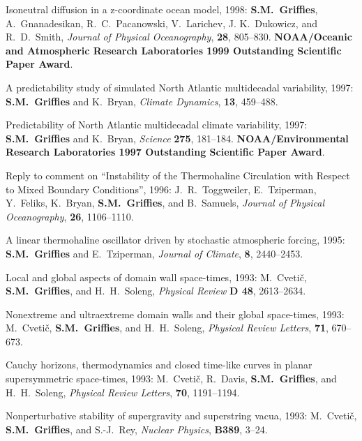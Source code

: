 \begin{etaremune}
\item Isoneutral diffusion in a z-coordinate ocean model, 1998: {\bf
    S.M.\ Grif\/f\/ies}, A.\ Gnanadesikan, R.\ C.\ Pacanowski, V.\
  Larichev, J. K.\ Dukowicz, and R.\ D.\ Smith, {\em Journal of
    Physical Oceanography}, {\bf 28}, 805--830.  {\bf
    NOAA/Oceanic and Atmospheric Research Laboratories 1999
    Outstanding Scientific Paper Award}.
  
\item A predictability study of simulated North Atlantic multidecadal
variability, 1997: {\bf S.M.\ Grif\/f\/ies} and K.\ Bryan, {\em
Climate Dynamics}, {\bf 13}, 459--488.
  
\item Predictability of North Atlantic multidecadal climate
  variability, 1997: {\bf S.M.\ Grif\/f\/ies} and K.\ Bryan, {\em
    Science} {\bf 275}, 181--184. {\bf NOAA/Environmental
    Research Laboratories 1997 Outstanding Scientific Paper Award}.
 
\item Reply to comment on ``Instability of the Thermohaline
Circulation with Respect to Mixed Boundary Conditions'', 1996: J.\ R.\
Toggweiler, E.\ Tziperman, Y.\ Feliks, K.\ Bryan, {\bf S.M.\
Grif\/f\/ies}, and B.\ Samuels, {\em Journal of Physical
Oceanography}, {\bf 26}, 1106--1110.
  
\item A linear thermohaline oscillator driven by stochastic
atmospheric forcing, 1995: {\bf S.M.\ Grif\/f\/ies} and E.\ Tziperman,
{\em Journal of Climate}, {\bf 8}, 2440--2453.

\item Local and global aspects of domain wall space-times, 1993: M.\
Cveti\v c, {\bf S.M.\ Grif\/f\/ies}, and H.\ H.\ Soleng, {\em Physical
Review} {\bf D 48}, 2613--2634.

\item Nonextreme and ultraextreme domain walls and their global
space-times, 1993: M.\ Cveti\v c, {\bf S.M.\ Grif\/f\/ies}, and H.\
H.\ Soleng, {\em Physical Review Letters}, {\bf 71}, 670--673.

\item Cauchy horizons, thermodynamics and closed time-like curves in
planar supersymmetric space-times, 1993: M.\ Cveti\v c, R.\ Davis, {\bf
S.M.\ Grif\/f\/ies}, and H.\ H.\ Soleng, {\em Physical Review
Letters}, {\bf 70}, 1191--1194.
                                                                 
\item Nonperturbative stability of supergravity and superstring vacua, 1993:
M.\ Cveti\v c, {\bf S.M.\ Grif\/f\/ies}, and S.-J.\ Rey, {\em Nuclear
Physics}, {\bf B389}, 3--24.
 

\end{etaremune}
